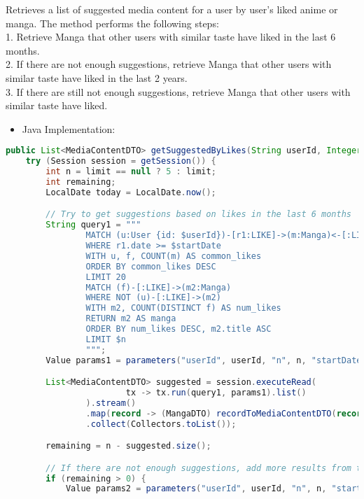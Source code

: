 Retrieves a list of suggested media content for a user by user's liked anime or manga.
The method performs the following steps:\\
1. Retrieve Manga that other users with similar taste have liked in the last 6 months.\\
2. If there are not enough suggestions, retrieve Manga that other users with similar taste have liked in the last 2 years.\\
3. If there are still not enough suggestions, retrieve Manga that other users with similar taste have liked.\\
\begin{itemize}
    \item Java Implementation:
\end{itemize}

\begin{mdframed}[style=customstyle]
\begin{lstlisting}[language=java]
public List<MediaContentDTO> getSuggestedByLikes(String userId, Integer limit) throws DAOException {
    try (Session session = getSession()) {
        int n = limit == null ? 5 : limit;
        int remaining;
        LocalDate today = LocalDate.now();

        // Try to get suggestions based on likes in the last 6 months
        String query1 = """
                MATCH (u:User {id: $userId})-[r1:LIKE]->(m:Manga)<-[:LIKE]-(f:User)
                WHERE r1.date >= $startDate
                WITH u, f, COUNT(m) AS common_likes
                ORDER BY common_likes DESC
                LIMIT 20
                MATCH (f)-[:LIKE]->(m2:Manga)
                WHERE NOT (u)-[:LIKE]->(m2)
                WITH m2, COUNT(DISTINCT f) AS num_likes
                RETURN m2 AS manga
                ORDER BY num_likes DESC, m2.title ASC
                LIMIT $n
                """;
        Value params1 = parameters("userId", userId, "n", n, "startDate", today.minusMonths(6));

        List<MediaContentDTO> suggested = session.executeRead(
                        tx -> tx.run(query1, params1).list()
                ).stream()
                .map(record -> (MangaDTO) recordToMediaContentDTO(record))
                .collect(Collectors.toList());

        remaining = n - suggested.size();

        // If there are not enough suggestions, add more results from the last 2 years
        if (remaining > 0) {
            Value params2 = parameters("userId", userId, "n", n, "startDate", today.minusYears(2));


\end{lstlisting}
\end{mdframed}
